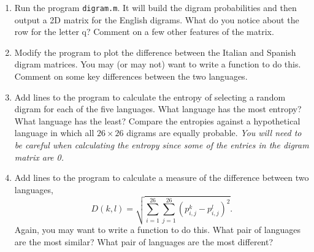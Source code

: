 \documentclass[12pt]{article}
\begin{document}
\begin{enumerate}
\begin{enumerate}
      \item Run the program \texttt{digram.m}. It will build the digram
	probabilities and then output a 2D matrix for the English digrams. What
	do you notice about the row for the letter \textsf{q}? Comment on a few other
	features of the matrix.
      \item %
	Modify the program
	 to plot the difference between the Italian and Spanish digram matrices.  You may (or may not) want to write a function to do this.
	Comment on some key differences between the two languages.
      \item Add lines to the program to calculate the entropy of selecting a
	random digram for each of the five languages. What language has the
	most entropy? What language has the least? Compare the entropies
	against a hypothetical language in which all $26\times 26$ digrams are
	equally probable. \textit{You will need to be careful when calculating the entropy since some of the entries in the digram matrix are  0.}
      \item Add lines to the program to calculate a measure of the difference between
	two languages, 
	\[
	D(k,l) = \sqrt{\sum_{i=1}^{26} \sum_{j=1}^{26} \left(p^k_{i,j} - p^l_{i,j}\right)^2}.
	\]
	Again, you may want to write a function to do this.  What pair of languages are the most similar? What pair of languages are the
	most different?
    \end{enumerate}

\end{enumerate}
\end{document}
